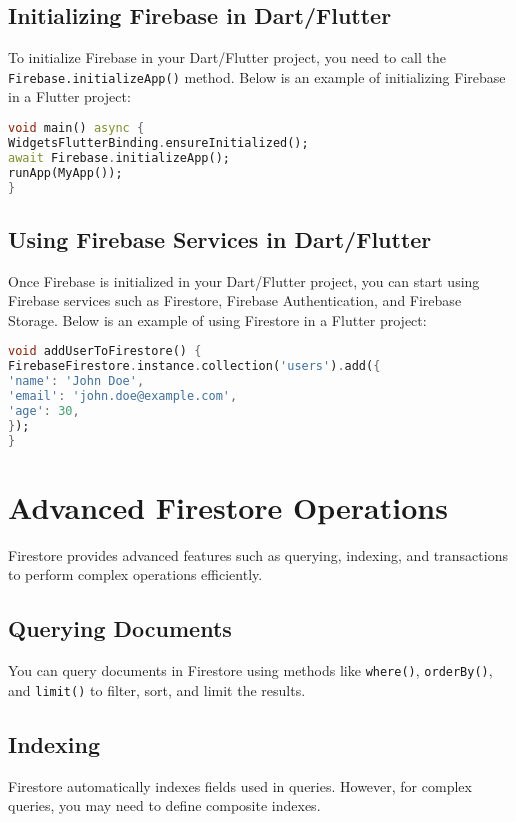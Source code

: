 \documentclass[12pt]{article}
\begin{document}
\subsection{Initializing Firebase in Dart/Flutter}
To initialize Firebase in your Dart/Flutter project, you need to call the \texttt{Firebase.initializeApp()} method. Below is an example of initializing Firebase in a Flutter project:

\begin{lstlisting}[language=Dart, caption={Initializing Firebase in a Flutter project}]
void main() async {
WidgetsFlutterBinding.ensureInitialized();
await Firebase.initializeApp();
runApp(MyApp());
}
\end{lstlisting}

\subsection{Using Firebase Services in Dart/Flutter}
Once Firebase is initialized in your Dart/Flutter project, you can start using Firebase services such as Firestore, Firebase Authentication, and Firebase Storage. Below is an example of using Firestore in a Flutter project:

\begin{lstlisting}[language=Dart, caption={Using Firestore in a Flutter project}]
void addUserToFirestore() {
FirebaseFirestore.instance.collection('users').add({
'name': 'John Doe',
'email': 'john.doe@example.com',
'age': 30,
});
}
\end{lstlisting}

\section{Advanced Firestore Operations}
Firestore provides advanced features such as querying, indexing, and transactions to perform complex operations efficiently.

\subsection{Querying Documents}
You can query documents in Firestore using methods like \texttt{where()}, \texttt{orderBy()}, and \texttt{limit()} to filter, sort, and limit the results.

\subsection{Indexing}
Firestore automatically indexes fields used in queries. However, for complex queries, you may need to define composite indexes.
\end{document}
